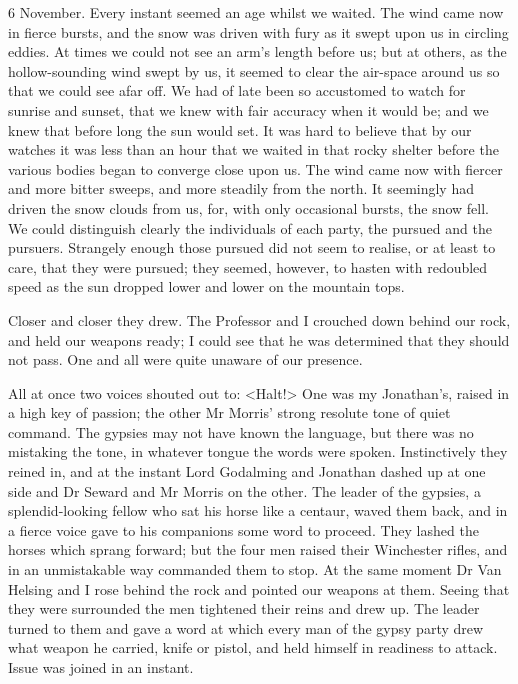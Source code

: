 \begin{diary}{6 November.}
Every instant seemed an age whilst we waited. The wind came now in fierce bursts, and the snow was driven with fury as it swept upon us in circling eddies. At times we could not see an arm's length before us; but at others, as the hollow-sounding wind swept by us, it seemed to clear the air-space around us so that we could see afar off. We had of late been so accustomed to watch for sunrise and sunset, that we knew with fair accuracy when it would be; and we knew that before long the sun would set. It was hard to believe that by our watches it was less than an hour that we waited in that rocky shelter before the various bodies began to converge close upon us. The wind came now with fiercer and more bitter sweeps, and more steadily from the north. It seemingly had driven the snow clouds from us, for, with only occasional bursts, the snow fell. We could distinguish clearly the individuals of each party, the pursued and the pursuers. Strangely enough those pursued did not seem to realise, or at least to care, that they were pursued; they seemed, however, to hasten with redoubled speed as the sun dropped lower and lower on the mountain tops.

Closer and closer they drew. The Professor and I crouched down behind our rock, and held our weapons ready; I could see that he was determined that they should not pass. One and all were quite unaware of our presence.

All at once two voices shouted out to: <Halt!> One was my Jonathan's, raised in a high key of passion; the other Mr Morris' strong resolute tone of quiet command. The gypsies may not have known the language, but there was no mistaking the tone, in whatever tongue the words were spoken. Instinctively they reined in, and at the instant Lord Godalming and Jonathan dashed up at one side and Dr Seward and Mr Morris on the other. The leader of the gypsies, a splendid-looking fellow who sat his horse like a centaur, waved them back, and in a fierce voice gave to his companions some word to proceed. They lashed the horses which sprang forward; but the four men raised their Winchester rifles, and in an unmistakable way commanded them to stop. At the same moment Dr Van Helsing and I rose behind the rock and pointed our weapons at them. Seeing that they were surrounded the men tightened their reins and drew up. The leader turned to them and gave a word at which every man of the gypsy party drew what weapon he carried, knife or pistol, and held himself in readiness to attack. Issue was joined in an instant.


\end{diary}
